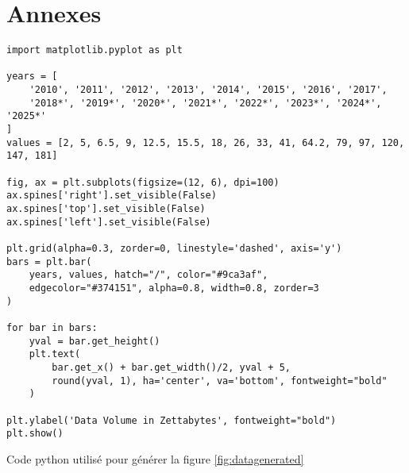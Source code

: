 \thispagestyle{empty}


\vspace*{3cm}

\chapter*{Annexes}
\label{appendix} 

\begin{listing}[!ht]
\begin{verbatim}
import matplotlib.pyplot as plt

years = [
    '2010', '2011', '2012', '2013', '2014', '2015', '2016', '2017', 
    '2018*', '2019*', '2020*', '2021*', '2022*', '2023*', '2024*', '2025*'
]
values = [2, 5, 6.5, 9, 12.5, 15.5, 18, 26, 33, 41, 64.2, 79, 97, 120, 147, 181]

fig, ax = plt.subplots(figsize=(12, 6), dpi=100)
ax.spines['right'].set_visible(False)
ax.spines['top'].set_visible(False)
ax.spines['left'].set_visible(False)

plt.grid(alpha=0.3, zorder=0, linestyle='dashed', axis='y')
bars = plt.bar(
    years, values, hatch="/", color="#9ca3af", 
    edgecolor="#374151", alpha=0.8, width=0.8, zorder=3
)

for bar in bars:
    yval = bar.get_height()
    plt.text(
        bar.get_x() + bar.get_width()/2, yval + 5, 
        round(yval, 1), ha='center', va='bottom', fontweight="bold"
    )

plt.ylabel('Data Volume in Zettabytes', fontweight="bold")
plt.show()
\end{verbatim}
\caption{Code python utilisé pour générer la figure \ref{fig:datagenerated}}
\label{appendix:code:python:plot-generation}
\end{listing}

